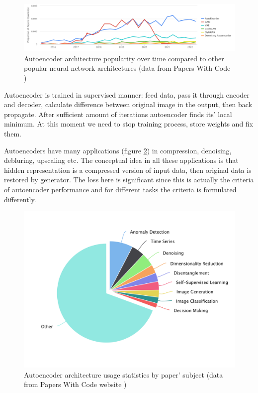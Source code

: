 \begin{figure}[!ht]
    \centering
    \includegraphics[width=\textwidth]{figure/autoencoder-popularity-over-time.png}
    \caption{Autoencoder architecture popularity over time compared to other popular neural network architectures (data from Papers With Code \cite{autoencoder_papers})}
    \label{autoencoder-popularity-dynamics}
\end{figure}

Autoencoder is trained in supervised manner: feed data, pass it through encoder and decoder, calculate difference between original image in the output, then back propagate. After sufficient amount of iterations autoencoder finds its' local minimum. At this moment we need to stop training process, store weights and fix them.

Autoencoders have many applications (figure \ref{autoencoder-popularity-stats}) in compression, denoising, debluring, upscaling etc. The conceptual idea in all these applications is that hidden representation is a compressed version of input data, then original data is restored by generator. The loss here is significant since this is actually the criteria of autoencoder performance and for different tasks the criteria is formulated differently.

\begin{figure}[!ht]
    \centering
    \includegraphics[width=\textwidth]{figure/autoencoder-popularity-stats.png}
    \caption{Autoencoder architecture usage statistics by paper' subject (data from Papers With Code website \cite{autoencoder_papers})}
    \label{autoencoder-popularity-stats}
\end{figure}

